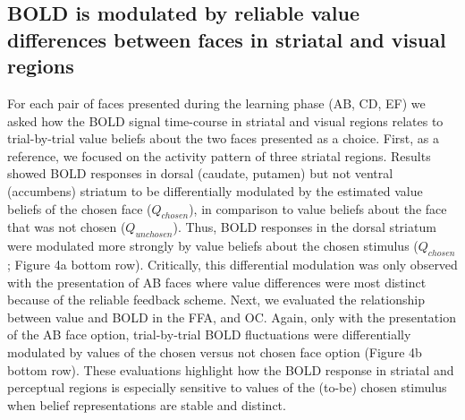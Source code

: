 \documentclass[]{article}
\begin{document}
\hypertarget{bold-is-modulated-by-reliable-value-differences-between-faces-in-striatal-and-visual-regions}{%
\subsection{BOLD is modulated by reliable value differences between
faces in striatal and visual
regions}\label{bold-is-modulated-by-reliable-value-differences-between-faces-in-striatal-and-visual-regions}}

For each pair of faces presented during the learning phase (AB, CD, EF)
we asked how the BOLD signal time-course in striatal and visual regions
relates to trial-by-trial value beliefs about the two faces presented as
a choice. First, as a reference, we focused on the activity pattern of
three striatal regions. Results showed BOLD responses in dorsal
(caudate, putamen) but not ventral (accumbens) striatum to be
differentially modulated by the estimated value beliefs of the chosen
face (\(Q_{chosen}\)), in comparison to value beliefs about the face
that was not chosen (\(Q_{unchosen}\)). Thus, BOLD responses in the
dorsal striatum were modulated more strongly by value beliefs about the
chosen stimulus (\(Q_{chosen}\); Figure 4a bottom row). Critically, this
differential modulation was only observed with the presentation of AB
faces where value differences were most distinct because of the reliable
feedback scheme. Next, we evaluated the relationship between value and
BOLD in the FFA, and OC. Again, only with the presentation of the AB
face option, trial-by-trial BOLD fluctuations were differentially
modulated by values of the chosen versus not chosen face option (Figure
4b bottom row). These evaluations highlight how the BOLD response in
striatal and perceptual regions is especially sensitive to values of the
(to-be) chosen stimulus when belief representations are stable and
distinct.
\end{document}
